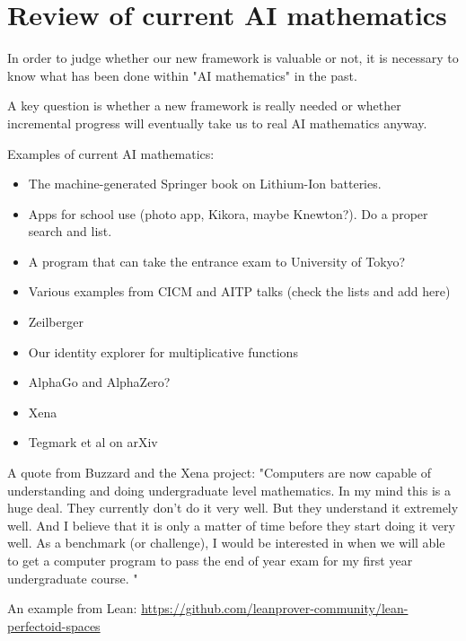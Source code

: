 
\section{Review of current AI mathematics}

In order to judge whether our new framework is valuable or not, it is necessary to know what has been done within "AI mathematics" in the past.

A key question is whether a new framework is really needed or whether incremental progress will eventually take us to real AI mathematics anyway.

Examples of current AI mathematics:

\begin{itemize}
\item The machine-generated Springer book on Lithium-Ion batteries.
\item Apps for school use (photo app, Kikora, maybe Knewton?). Do a proper search and list.
\item A program that can take the entrance exam to University of Tokyo?
\item Various examples from CICM and AITP talks (check the lists and add here)
\item Zeilberger
\item Our identity explorer for multiplicative functions
\item AlphaGo and AlphaZero?
\item Xena
\item Tegmark et al on arXiv
\end{itemize}

A quote from Buzzard and the Xena project: "Computers are now capable of understanding and doing undergraduate level mathematics. In my mind this is a huge deal. They currently don’t do it very well. But they understand it extremely well. And I believe that it is only a matter of time before they start doing it very well. As a benchmark (or challenge), I would be interested in when we will able to get a computer program to pass the end of year exam for my first year undergraduate course. "

An example from Lean:
\url{https://github.com/leanprover-community/lean-perfectoid-spaces}
